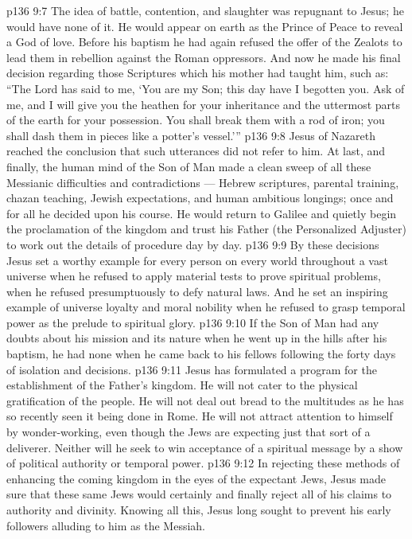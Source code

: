 \vs p136 9:7 The idea of battle, contention, and slaughter was repugnant to Jesus; he would have none of it. He would appear on earth as the Prince of Peace to reveal a God of love. Before his baptism he had again refused the offer of the Zealots to lead them in rebellion against the Roman oppressors. And now he made his final decision regarding those Scriptures which his mother had taught him, such as: “The Lord has said to me, ‘You are my Son; this day have I begotten you. Ask of me, and I will give you the heathen for your inheritance and the uttermost parts of the earth for your possession. You shall break them with a rod of iron; you shall dash them in pieces like a potter’s vessel.’”
\vs p136 9:8 Jesus of Nazareth reached the conclusion that such utterances did not refer to him. At last, and finally, the human mind of the Son of Man made a clean sweep of all these Messianic difficulties and contradictions --- Hebrew scriptures, parental training, chazan teaching, Jewish expectations, and human ambitious longings; once and for all he decided upon his course. He would return to Galilee and quietly begin the proclamation of the kingdom and trust his Father (the Personalized Adjuster) to work out the details of procedure day by day.
\vs p136 9:9 \pc By these decisions Jesus set a worthy example for every person on every world throughout a vast universe when he refused to apply material tests to prove spiritual problems, when he refused presumptuously to defy natural laws. And he set an inspiring example of universe loyalty and moral nobility when he refused to grasp temporal power as the prelude to spiritual glory.
\vs p136 9:10 \pc If the Son of Man had any doubts about his mission and its nature when he went up in the hills after his baptism, he had none when he came back to his fellows following the forty days of isolation and decisions.
\vs p136 9:11 Jesus has formulated a program for the establishment of the Father’s kingdom. He will not cater to the physical gratification of the people. He will not deal out bread to the multitudes as he has so recently seen it being done in Rome. He will not attract attention to himself by wonder\hyp{}working, even though the Jews are expecting just that sort of a deliverer. Neither will he seek to win acceptance of a spiritual message by a show of political authority or temporal power.
\vs p136 9:12 In rejecting these methods of enhancing the coming kingdom in the eyes of the expectant Jews, Jesus made sure that these same Jews would certainly and finally reject all of his claims to authority and divinity. Knowing all this, Jesus long sought to prevent his early followers alluding to him as the Messiah.
